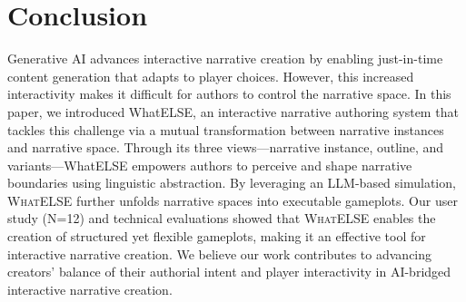 




\section{Conclusion}

Generative AI advances interactive narrative creation by enabling just-in-time content generation that adapts to player choices. However, this increased interactivity makes it difficult for authors to control the narrative space. In this paper, we introduced WhatELSE, an interactive narrative authoring system that tackles this challenge via a mutual transformation between narrative instances and narrative space. Through its three views—narrative instance, outline, and variants—WhatELSE empowers authors to perceive and shape narrative boundaries using linguistic abstraction. By leveraging an LLM-based simulation, \textsc{WhatELSE} further unfolds narrative spaces into executable gameplots. Our user study (N=12) and technical evaluations showed that \textsc{WhatELSE} enables the creation of structured yet flexible gameplots, making it an effective tool for interactive narrative creation. We believe our work contributes to advancing creators' balance of their authorial intent and player interactivity in AI-bridged interactive narrative creation.